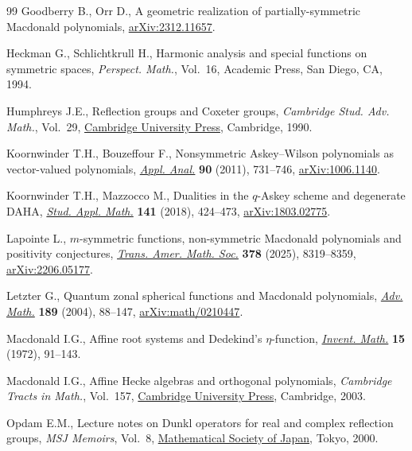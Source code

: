 \documentclass[pdftex]{sigma}
\theoremstyle{definition}
\numberwithin{equation}{section}
\begin{document}
\begin{thebibliography}{99}
Goodberry B., Orr D., A geometric realization of partially-symmetric
 {M}acdonald polynomials,
 \href{http://arxiv.org/abs/2312.11657}{arXiv:2312.11657}.

Heckman G., Schlichtkrull H., Harmonic analysis and special functions on
 symmetric spaces, \textit{Perspect. Math.}, Vol.~16, Academic Press, San
 Diego, CA, 1994.

Humphreys J.E., Reflection groups and {C}oxeter groups, \textit{Cambridge Stud.
 Adv. Math.}, Vol.~29,
 \href{https://doi.org/10.1017/CBO9780511623646}{Cambridge University Press},
 Cambridge, 1990.

Koornwinder T.H., Bouzeffour F., Nonsymmetric {A}skey--{W}ilson polynomials as
 vector-valued polynomials,
 \href{https://doi.org/10.1080/00036811.2010.502117}{\textit{Appl. Anal.}}
 \textbf{90} (2011), 731--746,
 \href{http://arxiv.org/abs/1006.1140}{arXiv:1006.1140}.

Koornwinder T.H., Mazzocco M., Dualities in the {$q$}-{A}skey scheme and
 degenerate {DAHA}, \href{https://doi.org/10.1111/sapm.12229}{\textit{Stud.
 Appl. Math.}} \textbf{141} (2018), 424--473,
 \href{http://arxiv.org/abs/1803.02775}{arXiv:1803.02775}.

Lapointe L., {$m$}-symmetric functions, non-symmetric {M}acdonald polynomials
 and positivity conjectures,
 \href{https://doi.org/10.1090/tran/9351}{\textit{Trans. Amer. Math. Soc.}}
 \textbf{378} (2025), 8319--8359,
 \href{http://arxiv.org/abs/2206.05177}{arXiv:2206.05177}.

Letzter G., Quantum zonal spherical functions and {M}acdonald polynomials,
 \href{https://doi.org/10.1016/j.aim.2003.11.007}{\textit{Adv. Math.}}
 \textbf{189} (2004), 88--147,
 \href{http://arxiv.org/abs/math/0210447}{arXiv:math/0210447}.

Macdonald I.G., Affine root systems and {D}edekind's {$\eta $}-function,
 \href{https://doi.org/10.1007/BF01418931}{\textit{Invent. Math.}} \textbf{15}
 (1972), 91--143.

Macdonald I.G., Affine {H}ecke algebras and orthogonal polynomials,
 \textit{Cambridge Tracts in Math.}, Vol.~157,
 \href{https://doi.org/10.1017/CBO9780511542824}{Cambridge University Press},
 Cambridge, 2003.

Opdam E.M., Lecture notes on {D}unkl operators for real and complex reflection
 groups, \textit{MSJ Memoirs}, Vol.~8,
 \href{https://doi.org/10.2969/msjmemoirs/008010000}{Mathematical Society of
 Japan}, Tokyo, 2000.


\end{thebibliography}
\end{document}
